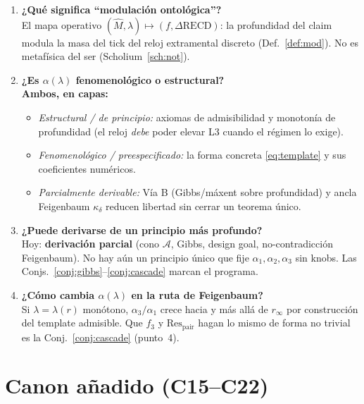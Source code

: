 \documentclass[11pt,a4paper]{article}
\theoremstyle{definition}
\theoremstyle{plain}
\theoremstyle{remark}
\newcommand{\Res}{\mathrm{Res}}
\newcommand{\RECD}{\mathrm{RECD}}
\begin{document}
\begin{enumerate}[label=\textbf{Q\arabic*.}, leftmargin=*]
  \item \textbf{¿Qu\'e significa ``modulación ontológica''?}\\
  El mapa operativo
  $(\widehat{M},\lambda)\mapsto(f,\Delta\RECD)$: la profundidad del claim
  modula la masa del tick del reloj extramental discreto
  (Def.~\ref{def:mod}). No es metaf\'isica del ser
  (Scholium~\ref{sch:not}).

  \item \textbf{¿Es $\alpha(\lambda)$ fenomenológico o estructural?}\\
  \textbf{Ambos, en capas:}
  \begin{itemize}
    \item \emph{Estructural / de principio:} axiomas de admisibilidad y
    monoton\'ia de profundidad (el reloj \emph{debe} poder elevar L3
    cuando el r\'egimen lo exige).
    \item \emph{Fenomenológico / preespecificado:} la forma concreta
    \eqref{eq:template} y sus coeficientes num\'ericos.
    \item \emph{Parcialmente derivable:} V\'ia B (Gibbs/m\'axent sobre
    profundidad) y ancla Feigenbaum $\kappa_\delta$ reducen libertad
    sin cerrar un teorema \'unico.
  \end{itemize}

  \item \textbf{¿Puede derivarse de un principio m\'as profundo?}\\
  Hoy: \textbf{derivación parcial} (cono $\mathcal{A}$, Gibbs,
  design goal, no-contradicción Feigenbaum). No hay a\'un un principio
  \'unico que fije $\alpha_1,\alpha_2,\alpha_3$ sin knobs. Las Conjs.\
  \ref{conj:gibbs}--\ref{conj:cascade} marcan el programa.

  \item \textbf{¿C\'omo cambia $\alpha(\lambda)$ en la ruta de
  Feigenbaum?}\\
  Si $\lambda=\lambda(r)$ mon\'otono, $\alpha_3/\alpha_1$ crece hacia y
  m\'as all\'a de $r_\infty$ por construcci\'on del template admisible.
  Que $f_3$ y $\Res_{\mathrm{pair}}$ hagan lo mismo de forma no trivial
  es la Conj.~\ref{conj:cascade} (punto~4).
\end{enumerate}

\section{Canon a\~nadido (C15--C22)}
\label{sec:canon}
\end{document}
